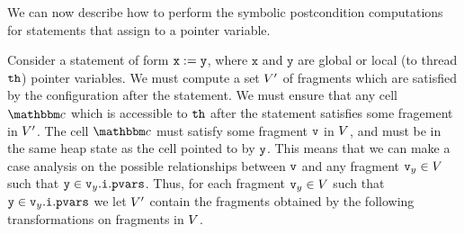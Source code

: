 We can now describe how to perform the symbolic postcondition computations for
statements that assign to a pointer variable.

Consider a statement of form
${\tt x := y}$, where $\mathtt{x}$ and $\mathtt{y}$ are global or local
(to thread ${\tt th}$) pointer variables. We must compute a set $V'$ of
fragments which are satisfied by the configuration after the statement.
We must ensure that any cell $\cell$ which is accessible to ${\tt th}$ after
the statement satisfies some fragement in $V'$.
The cell $\cell$ must satisfy some
fragment $\mathtt{v}$ in $V$, and must be in the same heap state as
the cell pointed to by $\mathtt{y}$. 
This means that we can make a case analysis on the possible relationships
between $\mathtt{v}$ and any fragment $\mathtt{v}_y\in V$ such that
$\mathtt{y} \in \mathtt{v}_y.\mathtt{i}.\mathtt{pvars}$.
Thus, for each fragment $\mathtt{v}_y\in V$ such that
$\mathtt{y} \in \mathtt{v}_y.\mathtt{i}.\mathtt{pvars}$ we let $V'$ contain
the fragments obtained by the following transformations on fragments in
$V$.
